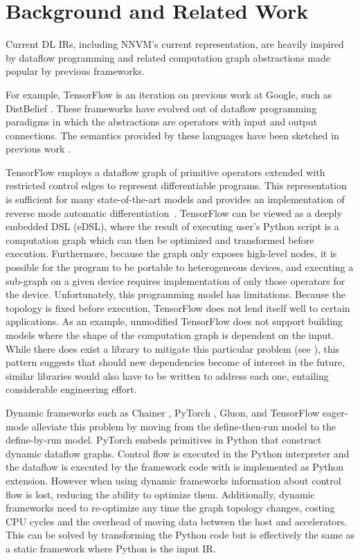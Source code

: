 \section{Background and Related Work}
\label{background}

Current DL IRs, including NNVM's current
representation, are heavily inspired by dataflow programming and
related computation graph abstractions made popular by previous frameworks.

For example, TensorFlow \cite{tensorflow} is an iteration on previous work at Google, such
as DistBelief \cite{distbelief}. These frameworks have evolved out of dataflow
programming paradigms in which the abstractions are operators with input and
output connections. The semantics provided by these languages have been
sketched in previous work \cite{tf_comp_model}.

TensorFlow employs a dataflow graph of primitive operators extended with restricted control
edges to represent differentiable programs. This representation is sufficient
for many state-of-the-art models and provides an implementation of reverse mode
automatic differentiation~{\cite{ad_survey, tensorflow}}.
%
TensorFlow can be viewed as a deeply embedded DSL (eDSL), where the result of executing
user's Python script is a computation graph which can then be optimized and
transformed before execution.
%
Furthermore, because the graph only exposes high-level nodes, it is possible
for the program to be portable to heterogeneous devices, and executing a sub-graph
on a given device requires implementation of only those operators for the device.
 Unfortunately, this programming model has limitations.
%
Because the topology is fixed before execution, TensorFlow does not lend itself
well to certain applications. As an example, unmodified TensorFlow does not support
building models where the shape of the computation graph is dependent on the input.
While there does exist a library to mitigate this particular problem
(see \cite{tensorflowfold}), this pattern suggests that should new dependencies become
of interest in the future, similar libraries would also have to be written to address each one,
entailing considerable engineering effort.

Dynamic frameworks such as Chainer \cite{chainer_learningsys2015},
PyTorch \cite{pytorch_ad}, Gluon, and TensorFlow eager-mode \cite{tf_eager}
alleviate this problem by moving from the define-then-run model
to the define-by-run model. PyTorch embeds primitives in Python that construct
dynamic dataflow graphs. Control flow is executed in the Python interpreter and
the dataflow is executed by the framework code with is implemented as Python extension.
However when using dynamic frameworks information about control flow is lost, reducing
the ability to optimize them. Additionally, dynamic frameworks need to re-optimize any time
the graph topology changes, costing CPU cycles and the overhead of moving data between
the host and accelerators. This can be solved by transforming the Python code but is effectively
the same as a static framework where Python is the input IR.

